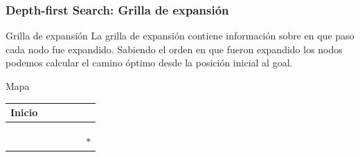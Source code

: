 \begin{frame}
    \frametitle{Depth-first Search: Grilla de expansión}
    \begin{footnotesize}
        \begin{block}{Grilla de expansión}
            La grilla de expansión contiene información sobre en que paso cada nodo fue expandido.
            Sabiendo el orden en que fueron expandido los nodos podemos calcular el camino óptimo desde la posición inicial al goal.
        \end{block}
    
        \begin{center}
            Mapa\\
            \begin{tabularx}{6cm}{|X|X|X|X|X|X|}
                \hline
                Inicio &  & \cellcolor{black} & & & \\
                \hline
                & &  & &  & \\
                \hline
                & & \cellcolor{black} &  & \cellcolor{black} & \\
                \hline
                & & \cellcolor{black} &  & \cellcolor{black} & \\
                \hline
                & & \cellcolor{black} & & \cellcolor{black} & $*$\\
                \hline
            \end{tabularx}
        \end{center}


\end{footnotesize}
\end{frame}
